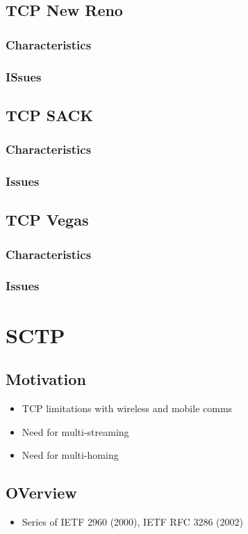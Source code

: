 \documentclass[a4paper]{article}
\begin{document}
\subsection{TCP New Reno}
\subsubsection{Characteristics}
\subsubsection{ISsues}
\subsection{TCP SACK}
\subsubsection{Characteristics}
\subsubsection{Issues}
\subsection{TCP Vegas}
\subsubsection{Characteristics}
\subsubsection{Issues}
\section{SCTP}
\subsection{Motivation}
\begin{itemize}
	\item TCP limitations with wireless and mobile comms
	\item Need for multi-streaming
	\item Need for multi-homing
\end{itemize}
\subsection{OVerview}
\begin{itemize}
	\item Series of IETF 2960 (2000), IETF RFC 3286 (2002)
\end{itemize}
\end{document}
